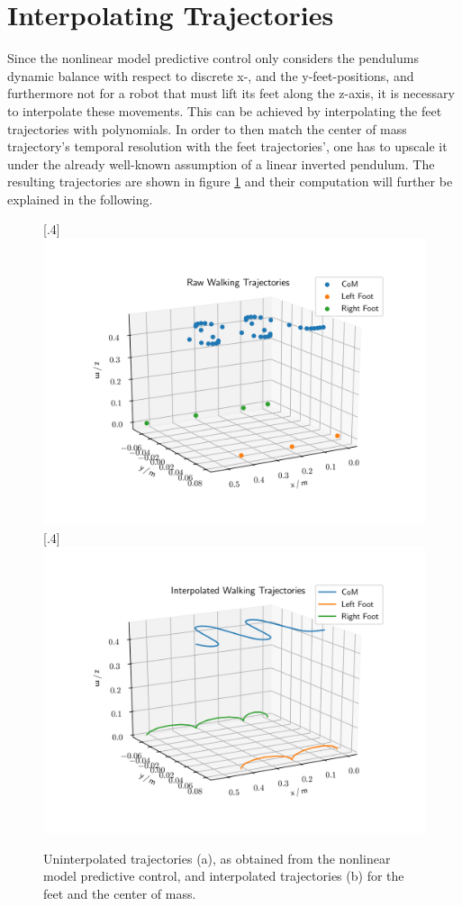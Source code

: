 \FloatBarrier
\section{Interpolating Trajectories}
\label{sec::23_it}
Since the nonlinear model predictive control only considers the pendulums dynamic balance with respect to discrete x-, and the y-feet-positions, and furthermore not for a robot that must lift its feet along the z-axis, it is necessary to interpolate these movements. This can be achieved by interpolating the feet trajectories with polynomials. In order to then match the center of mass trajectory's temporal resolution with the feet trajectories', one has to upscale it under the already well-known assumption of a linear inverted pendulum. The resulting trajectories are shown in figure \ref{fig::23_ip} and their computation  will further be explained in the following. 
\begin{figure}[h!]
	\centering
	\subcaptionbox{}%
	[.4\linewidth]{\includegraphics[scale=.4]{chapters/02_foundations_for_humanoid_walking/img/raw_results.png}}
	\subcaptionbox{}%
	[.4\linewidth]{\includegraphics[scale=.4]{chapters/02_foundations_for_humanoid_walking/img/interpolated_results.png}}
	\caption{Uninterpolated trajectories (a), as obtained from the nonlinear model predictive control, and interpolated trajectories (b) for the feet and the center of mass.}
	\label{fig::23_ip}
\end{figure}
\FloatBarrier
